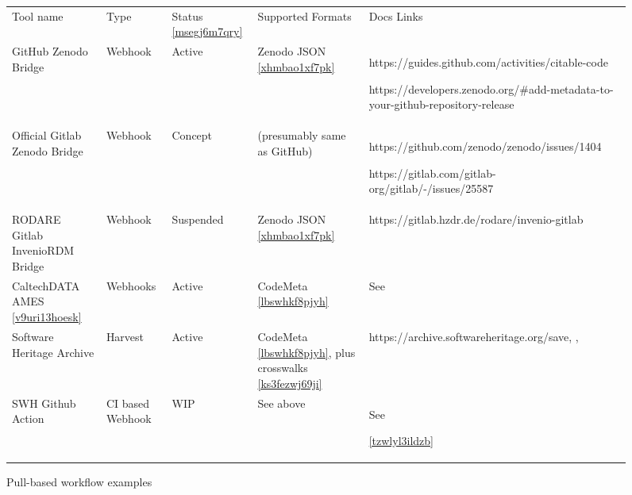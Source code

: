 \documentclass{article}
\begin{document}
\begin{figure}
\begin{tabular}{*5{l}}
Tool name

& Type

& Status \ref{msegj6m7qry}

& Supported Formats

& Docs Links

\\
GitHub Zenodo Bridge

& Webhook

& Active

& Zenodo JSON \ref{xhmbao1xf7pk}

& https://guides.github.com/activities/citable-code

https://developers.zenodo.org/\#add-metadata-to-your-github-repository-release

\\
Official Gitlab Zenodo Bridge

& Webhook

& Concept

& (presumably same as GitHub)

& https://github.com/zenodo/zenodo/issues/1404

https://gitlab.com/gitlab-org/gitlab/-/issues/25587

\\
RODARE Gitlab InvenioRDM Bridge

& Webhook

& Suspended

& Zenodo JSON \ref{xhmbao1xf7pk}

& https://gitlab.hzdr.de/rodare/invenio-gitlab

\\
CaltechDATA AMES \ref{v9uri13hoesk}

& Webhooks

& Active

& CodeMeta \ref{lbswhkf8pjyh}

& See \cite{11045035/44KEF4EY}

\\
Software Heritage Archive

& Harvest

& Active

& CodeMeta \ref{lbswhkf8pjyh}, plus crosswalks \ref{ks3fezwj69ji}

& https://archive.softwareheritage.org/save, \cite{11045035/7EDI2C4A}, \cite{11045035/FYSTKDUI}

\\
SWH Github Action

& CI based Webhook

& WIP

& See above

& See 

\ref{tzwlyl3ildzb}

\\
\end{tabular}
\caption{Pull-based workflow examples}
\label{dououxj84y9j}
\end{figure}
\end{document}
